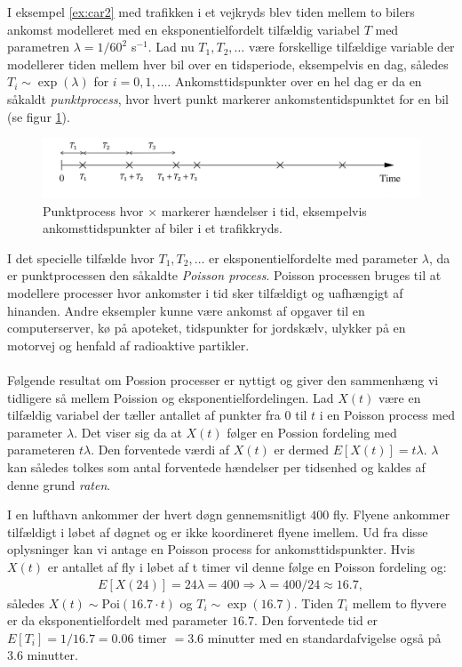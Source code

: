 I eksempel \ref{ex:car2} med trafikken i et vejkryds blev tiden mellem to bilers ankomst modelleret med en eksponentielfordelt tilfældig variabel $T$ med parametren $\lambda = 1/60^2$ s$^{-1}$. Lad nu $T_1, T_2, \dots$ være forskellige tilfældige variable der modellerer tiden mellem hver bil over en tidsperiode, eksempelvis en dag, således $T_i \sim \exp(\lambda)$ for $i = 0,1,\dots$. Ankomsttidspunkter over en hel dag er da en såkaldt \emph{punktprocess}, hvor hvert punkt markerer ankomstentidspunktet for en bil (se figur \ref{fig:process1}).
\begin{figure}[H]
\centering
\includegraphics[width = \textwidth]{process1.png}
\caption{Punktprocess hvor $\times$ markerer hændelser i tid, eksempelvis ankomsttidspunkter af biler i et trafikkryds.} \label{fig:process1}
\end{figure}
I det specielle tilfælde hvor $T_1, T_2, \dots$ er eksponentielfordelte med parameter $\lambda$, da er punktprocessen den såkaldte \emph{Poisson process}. Poisson processen bruges til at modellere processer hvor ankomster i tid sker tilfældigt og uafhængigt af hinanden. Andre eksempler kunne være ankomst af opgaver til en computerserver, kø på apoteket, tidspunkter for jordskælv, ulykker på en motorvej og henfald af radioaktive partikler.
\\ \\  
Følgende resultat om Possion processer er nyttigt og giver den sammenhæng vi tidligere så mellem Poission og eksponentielfordelingen. Lad $X(t)$ være en tilfældig variabel der tæller antallet af punkter fra $0$ til $t$ i en Poisson process med parameter $\lambda$. Det viser sig da at $X(t)$ følger en Possion fordeling med parameteren $t \lambda $. Den forventede værdi af $X(t)$ er dermed $E[X(t)] = t \lambda$. $\lambda$ kan således tolkes som antal forventede hændelser per tidsenhed og kaldes af denne grund \emph{raten}. 
\begin{example}
I en lufthavn ankommer der hvert døgn gennemsnitligt $400$ fly. Flyene ankommer tilfældigt i løbet af døgnet og er ikke koordineret flyene imellem. Ud fra disse oplysninger kan vi antage en Poisson process for ankomsttidspunkter. Hvis $X(t)$ er antallet af fly i løbet af t timer vil denne følge en Poisson fordeling og:
\begin{align*}
E[X(24)] = 24\lambda = 400 \Rightarrow \lambda = 400/24 \approx 16.7,
\end{align*}
således $X(t) \sim \text{Poi}(16.7\cdot t)$ og $T_i \sim \exp(16.7)$. Tiden $T_i$ mellem to flyvere er da eksponentielfordelt med parameter $16.7$. Den forventede tid er $E[T_i] = 1/16.7 = 0.06$ timer $= 3.6$ minutter med en standardafvigelse også på $3.6$ minutter. 
\end{example}
